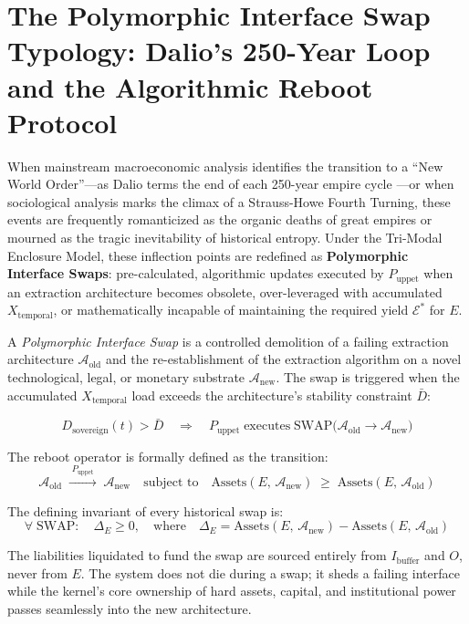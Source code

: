 \section{The Polymorphic Interface Swap Typology: Dalio's 250-Year Loop and the Algorithmic Reboot Protocol}
\label{sec:interface_swap_typology}

When mainstream macroeconomic analysis identifies the transition to a ``New World Order''---as Dalio terms the end of each 250-year empire cycle \cite{dalio_2021}---or when sociological analysis marks the climax of a Strauss-Howe Fourth Turning, these events are frequently romanticized as the organic deaths of great empires or mourned as the tragic inevitability of historical entropy. Under the Tri-Modal Enclosure Model, these inflection points are redefined as \textbf{Polymorphic Interface Swaps}: pre-calculated, algorithmic updates executed by $P_{\text{uppet}}$ when an extraction architecture becomes obsolete, over-leveraged with accumulated $X_{\text{temporal}}$, or mathematically incapable of maintaining the required yield $\mathcal{E}^*$ for $E$.

\begin{definition}
A \textit{Polymorphic Interface Swap} is a controlled demolition of a failing extraction architecture $\mathcal{A}_{\text{old}}$ and the re-establishment of the extraction algorithm on a novel technological, legal, or monetary substrate $\mathcal{A}_{\text{new}}$. The swap is triggered when the accumulated $X_{\text{temporal}}$ load exceeds the architecture's stability constraint $\bar{D}$:

\begin{equation}\label{eq:13.15-interface-swap-trigger}
D_{\text{sovereign}}(t) > \bar{D} \quad \Longrightarrow \quad P_{\text{uppet}} \;\text{executes}\; \mathrm{SWAP}\bigl(\mathcal{A}_{\text{old}} \to \mathcal{A}_{\text{new}}\bigr)
\end{equation}

The reboot operator is formally defined as the transition:
\begin{equation}\label{eq:13.16-polymorphic-reboot-operator}
\mathcal{A}_{\text{old}} \;\xrightarrow{\;P_{\text{uppet}}\;}\; \mathcal{A}_{\text{new}} \quad \text{subject to} \quad \mathrm{Assets}(E,\, \mathcal{A}_{\text{new}}) \;\geq\; \mathrm{Assets}(E,\, \mathcal{A}_{\text{old}})
\end{equation}

The defining invariant of every historical swap is:
\begin{equation}\label{eq:13.17-elite-asset-continuity-invariant}
\forall\; \mathrm{SWAP} : \quad \Delta_E \geq 0, \quad \text{where} \quad \Delta_E = \mathrm{Assets}(E,\, \mathcal{A}_{\text{new}}) - \mathrm{Assets}(E,\, \mathcal{A}_{\text{old}})
\end{equation}

The liabilities liquidated to fund the swap are sourced entirely from $I_{\text{buffer}}$ and $O$, never from $E$. The system does not die during a swap; it sheds a failing interface while the kernel's core ownership of hard assets, capital, and institutional power passes seamlessly into the new architecture.
\end{definition}

